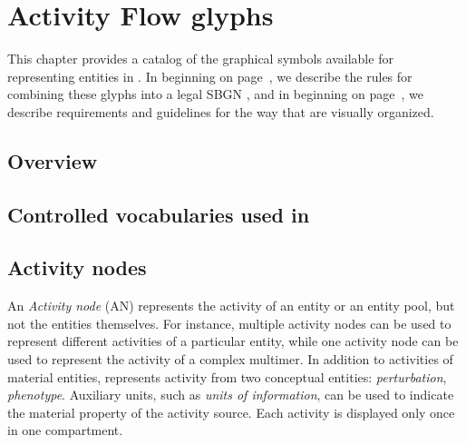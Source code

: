 \chapter{Activity Flow glyphs}


This chapter provides a catalog of the graphical symbols available for representing entities in \AFs. In  beginning on page~\pageref{chp:af:grammar}, we describe the rules for combining these glyphs into a legal SBGN \AFm, and in  beginning on page~\pageref{chp:af:layout}, we describe requirements and guidelines for the way that \AFms are visually organized.

\section{Overview}



\section{Controlled vocabularies used in \SBGNAFLone}\label{af:sec:CVs}




\section{Activity nodes}\label{sec:af:ANs}

An \emph{Activity node} (AN) represents the activity of an entity or an entity pool, but not the entities themselves. For instance, multiple activity nodes can be used to represent different activities of a particular entity, while one activity node can be used to represent the activity of a complex multimer. In addition to activities of material entities, \SBGNAFLone represents activity from two conceptual entities: \emph{perturbation}, \emph{phenotype}.  Auxiliary units, such as \emph{units of information}, can be used to indicate the material property of the activity source.  Each activity is displayed only once in one compartment.



%



